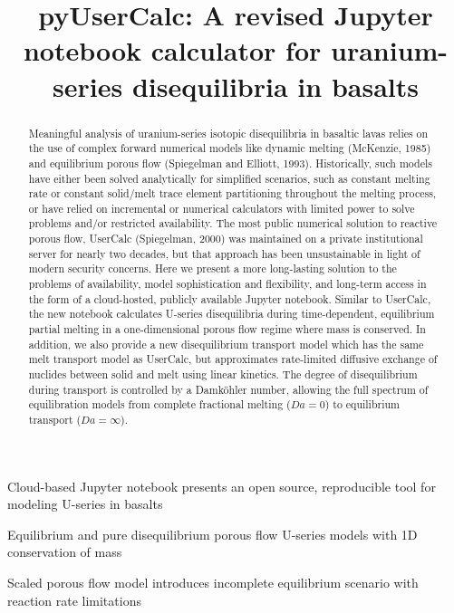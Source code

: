 \documentclass[draft]{agujournal2019}
\begin{document}
\title{pyUserCalc: A revised Jupyter notebook calculator for uranium-series disequilibria in basalts}
    
    

\pagecolor{white}

\begin{keypoints}
\item Cloud-based Jupyter notebook presents an open source, reproducible
tool for modeling U-series in basalts
\item Equilibrium and pure disequilibrium porous flow U-series models with
1D conservation of mass
\item Scaled porous flow model introduces incomplete equilibrium scenario
with reaction rate limitations
\end{keypoints}

    
    
\begin{abstract}
Meaningful analysis of uranium-series isotopic disequilibria in basaltic lavas relies on the use of complex forward numerical models like dynamic melting (McKenzie, 1985) and equilibrium porous flow (Spiegelman and Elliott, 1993). Historically, such models have either been solved analytically for simplified scenarios, such as constant melting rate or constant solid/melt trace element partitioning throughout the melting process, or have relied on incremental or numerical calculators with limited power to solve problems and/or restricted availability. The most public numerical solution to reactive porous flow, UserCalc (Spiegelman, 2000) was maintained on a private institutional server for nearly two decades, but that approach has been unsustainable in light of modern security concerns. Here we present a more long-lasting solution to the problems of availability, model sophistication and flexibility, and long-term access in the form of a cloud-hosted, publicly available Jupyter notebook. Similar to UserCalc, the new notebook calculates U-series disequilibria during time-dependent, equilibrium partial melting in a one-dimensional porous flow regime where mass is conserved. In addition, we also provide a new disequilibrium transport model which has the same melt transport model as UserCalc, but approximates rate-limited diffusive exchange of nuclides between solid and melt using linear kinetics. The degree of disequilibrium during transport is controlled by a Damk\"{o}hler number, allowing  the full spectrum of equilibration models from complete fractional melting ($Da=0$) to equilibrium transport ($Da=\infty$).  
\end{abstract}
\end{document}
